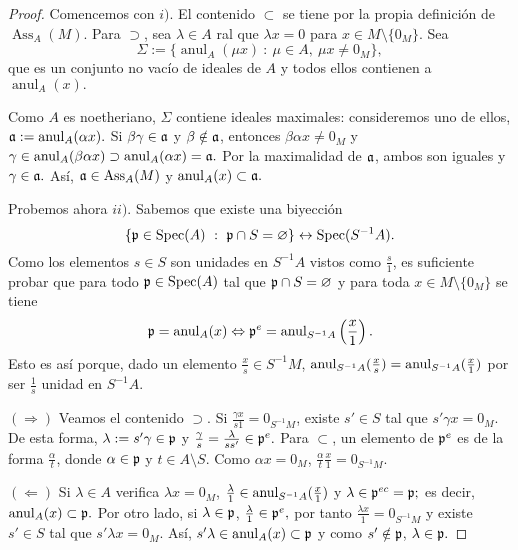 \documentclass[../main.tex]{subfiles}
\begin{document}
\begin{proof}
Comencemos con $i)$. El contenido $\subset$ se tiene por la propia definición de $\operatorname{Ass}_A(M)$. Para $\supset$, sea $\lambda\in A$ ral que $\lambda x=0$ para $x\in M\setminus\{0_M\}.$ Sea
$$\Sigma:=\{\operatorname{anul}_A(\mu x)\ :\ \mu\in A,\ \mu x\neq 0_M\},$$
que es un conjunto no vacío de ideales de $A$ y todos ellos contienen a $\operatorname{anul}_A(x).$

Como $A$ es noetheriano, $\Sigma$ contiene ideales maximales: consideremos uno de ellos, $\mathfrak{a}:=\operatorname{anul}_A(\alpha x).$ Si $\beta\gamma\in\mathfrak{a}$ y $\beta\notin\mathfrak{a}$, entonces $\beta\alpha x\neq 0_M$ y $\gamma\in\operatorname{anul}_A(\beta\alpha x)\supset\operatorname{anul}_A(\alpha x)=\mathfrak{a}.$ Por la maximalidad de $\mathfrak{a}$, ambos son iguales y $\gamma\in\mathfrak{a}.$ Así, $\mathfrak{a}\in\text{Ass}_A(M)$ y $\operatorname{anul}_A(x)\subset\mathfrak{a}.$

Probemos ahora $ii).$ Sabemos que existe una biyección
$$\{\mathfrak{p}\in\text{Spec}(A)\ :\ \mathfrak{p}\cap S=\varnothing\}\leftrightarrow\text{Spec}(S^{-1}A).$$
Como los elementos $s\in S$ son unidades en $S^{-1}A$ vistos como $\frac{s}{1}$, es suficiente probar que para todo $\mathfrak{p}\in\text{Spec}(A)$ tal que $\mathfrak{p}\cap S=\varnothing$ y para toda $x\in M\setminus\{0_M\}$ se tiene
$$\mathfrak{p}=\operatorname{anul}_A(x)\Leftrightarrow \mathfrak{p}^e=\operatorname{anul}_{S^{-1}A}\left(\frac{x}{1}\right).$$ Esto es así porque, dado un elemento $\frac{x}{s}\in S^{-1}M$, $\operatorname{anul}_{S^{-1}A}(\frac{x}{s})=\operatorname{anul}_{S^{-1}A}(\frac{x}{1})$ por ser $\frac{1}{s}$ unidad en $S^{-1}A.$

$(\Rightarrow)$ Veamos el contenido $\supset$. Si $\frac{\gamma x}{s 1}=0_{S^{-1}M}$, existe $s'\in S$ tal que $s'\gamma x=0_M$. De esta forma, $\lambda:=s'\gamma\in\mathfrak{p}$ y $\frac{\gamma}{s}=\frac{\lambda}{ss'}\in\mathfrak{p}^e.$ Para $\subset$, un elemento de $\mathfrak{p}^e$ es de la forma $\frac{\alpha}{t}$, donde $\alpha\in\mathfrak{p}$ y $t\in A\setminus S.$ Como $\alpha x=0_M$, $\frac{\alpha}{t}\frac{x}{1}=0_{S^{-1}M}.$

$(\Leftarrow)$ Si $\lambda\in A$ verifica $\lambda x=0_M$, $\frac{\lambda}{1}\in\operatorname{anul}_{S^{-1}A}(\frac{x}{1})$ y $\lambda\in\mathfrak{p}^{ec}=\mathfrak{p};$ es decir, $\operatorname{anul}_A(x)\subset\mathfrak{p}.$ Por otro lado, si $\lambda\in\mathfrak{p}$, $\frac{\lambda}{1}\in\mathfrak{p}^e,$ por tanto $\frac{\lambda x}{1}=0_{S^{-1}M}$ y existe $s'\in S$ tal que $s'\lambda x=0_M.$ Así, $s'\lambda\in\operatorname{anul}_A(x)\subset\mathfrak{p}$ y como $s'\notin\mathfrak{p}$, $\lambda\in\mathfrak{p}.$

\end{proof}
\end{document}
